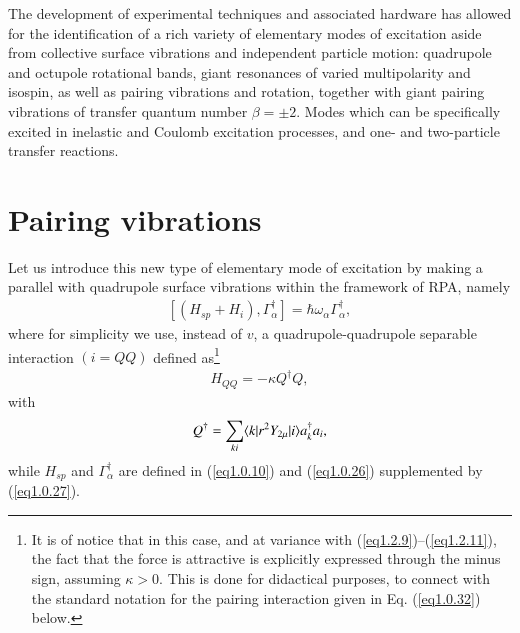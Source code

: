 The development of experimental techniques and associated hardware has allowed for the identification of a rich variety of elementary modes of excitation aside from collective surface vibrations  and independent particle motion: quadrupole and octupole rotational bands, giant resonances of varied multipolarity and isospin, as well as pairing vibrations and rotation, together with giant pairing vibrations of transfer quantum number $\beta=\pm 2$. Modes which can be specifically excited in inelastic and Coulomb excitation processes, and one- and two-particle transfer reactions.
\section{Pairing vibrations}\label{Sect1.3}
Let us introduce this new type of elementary mode of excitation by making a parallel with quadrupole surface vibrations within the framework of RPA, namely
\begin{align}\label{eq1.0.29}
\left[(H_{sp}+H_i),\Gamma_{\alpha}^\dagger\right]=\hbar\omega_\alpha\Gamma_{\alpha}^\dagger,
\end{align}
where for simplicity we use, instead of $v$, a quadrupole-quadrupole separable interaction $(i=QQ)$ defined as\footnote{It is of notice that in this case, and at variance with (\ref{eq1.2.9})--(\ref{eq1.2.11}), the fact that the force is attractive is explicitly expressed through the minus sign, assuming $\kappa>0$. This is done for didactical purposes, to connect with the standard notation for the pairing interaction given in Eq. (\ref{eq1.0.32}) below.}
\begin{align}\label{eq1.0.30}
H_{QQ}=-\kappa Q^\dagger Q,
\end{align}
with 
\begin{align}\label{eq1.0.31}
 Q^\dagger=\sum_{ki}\langle {k|r^2 Y_{2\mu}|i} \rangle a^\dagger_k a_i,
\end{align}
while $H_{sp}$ and $\Gamma^\dagger_\alpha$ are defined in (\ref{eq1.0.10}) and (\ref{eq1.0.26}) supplemented by (\ref{eq1.0.27}).

